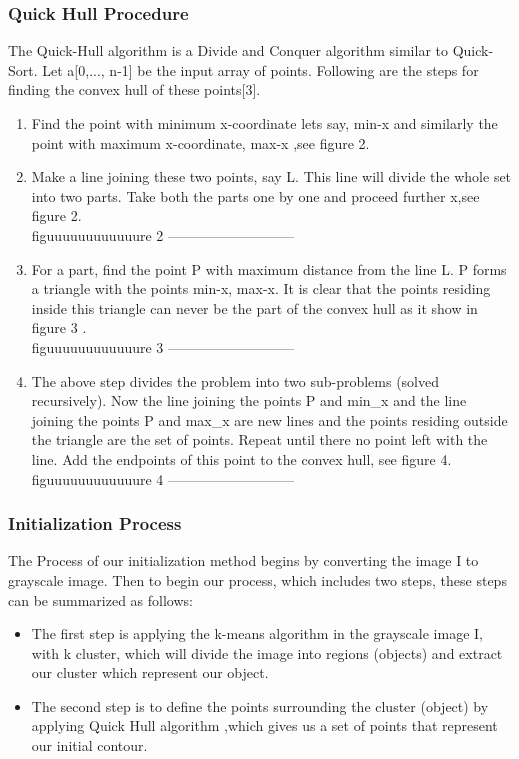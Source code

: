 \subsubsection*{Quick Hull Procedure}
The Quick-Hull algorithm is a Divide and Conquer algorithm similar to Quick-Sort. Let
a[0,..., n-1] be the input array of points. Following are the steps for finding the convex
hull of these points[3].
\begin{enumerate}
    \item Find the point with minimum x-coordinate lets say, min-x and similarly the
    point with maximum x-coordinate, max-x ,see figure 2.
    \item Make a line joining these two points, say L. This line will divide the whole set
    into two parts. Take both the parts one by one and proceed further x,see figure
    2.\\
    figuuuuuuuuuuuure 2 ---------------------------
    \item For a part, find the point P with maximum distance from the line L. P forms a
    triangle with the points min-x, max-x. It is clear that the points residing inside
    this triangle can never be the part of the convex hull as it show in figure 3 .\\
    figuuuuuuuuuuuure 3 ---------------------------
    \item The above step divides the problem into two sub-problems (solved
    recursively). Now the line joining the points P and min_x and the line joining
    the points P and max_x are new lines and the points residing outside the
    triangle are the set of points. Repeat until there no point left with the line. Add
    the endpoints of this point to the convex hull, see figure 4.\\
    figuuuuuuuuuuuure 4 ---------------------------

\end{enumerate}
\subsubsection{Initialization Process}
The Process of our initialization method begins by converting the image I to grayscale
image. Then to begin our process, which includes two steps, these steps can be
summarized as follows:
\begin{itemize}
    \item The first step is applying the k-means algorithm in the grayscale image I, with k
    cluster, which will divide the image into regions (objects) and extract our
    cluster which represent our object.
    \item The second step is to define the points surrounding the cluster (object) by
    applying Quick Hull algorithm ,which gives us a set of points that represent our
    initial contour.
\end{itemize}
